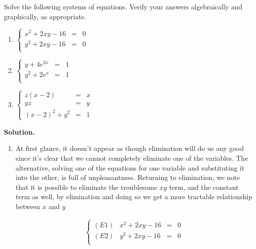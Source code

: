 \begin{ex}  \label{nonlinearex2} Solve the following systems of equations.  Verify your answers algebraically and graphically, as appropriate.

\begin{multicols}{3}

\begin{enumerate}

\item  $\left\{\begin{array}{rcl}  x^2 +2xy -16 & = & 0 \\ y^2 +2xy -16 & = & 0 \\ \end{array} \right.$

\item  $\left\{\begin{array}{rcl}  y+4e^{2x} & = & 1 \\y^2 + 2e^{x} & = & 1 \\ \end{array} \right.$

\item  $\left\{\begin{array}{rcl}   z(x-2) & = & x \\ yz & = & y \\ (x-2)^2+y^2 & = & 1 \end{array} \right.$


\end{enumerate}

\end{multicols}

{\bf Solution.}

\begin{enumerate}

\item  At first glance, it doesn't appear as though elimination will do us any good since it's clear that we cannot  completely eliminate one of the variables.  The alternative, solving one of the equations for one variable and substituting it into the other, is full of unpleasantness.  Returning to elimination,  we note that it is possible to eliminate the troublesome $xy$ term, and the constant term as well, by elimination and doing so we get a more tractable relationship between $x$ and $y$

\[ \begin{array}{ccc}

\left\{\begin{array}{lrcr} (E1) & x^2 +2xy -16 & = & 0 \\ (E2) & y^2 +2xy -16 & = & 0 \\ \end{array} \right.


\end{array}\]
\end{enumerate}
\end{ex}
